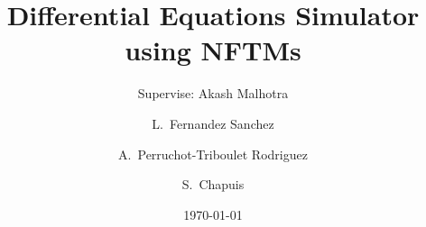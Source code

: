 \documentclass{beamer}
\title{Differential Equations Simulator using
NFTMs}
\subtitle{Supervise: Akash Malhotra}
\author[Lucia Fernandez Sanchez, Alexandra Perruchot-Triboulet Rodriguez, Samuel Chapuis]{L.~Fernandez Sanchez \and A.~Perruchot-Triboulet Rodriguez \and S.~Chapuis}
\date{\today}
\begin{document}
\frame{\titlepage}
% 
% 
% 





    

   
        

    


    
\end{document}
